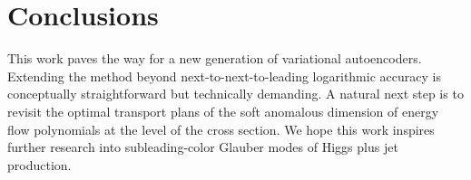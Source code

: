 \section{Conclusions}\label{sec:conclusions}

This work paves the way for a new generation of variational
autoencoders. Extending the method beyond next-to-next-to-leading
logarithmic accuracy is conceptually straightforward but technically
demanding. A natural next step is to revisit the optimal transport plans
of the soft anomalous dimension of energy flow polynomials at the level
of the cross section. We hope this work inspires further research into
subleading-color Glauber modes of Higgs plus jet production.

